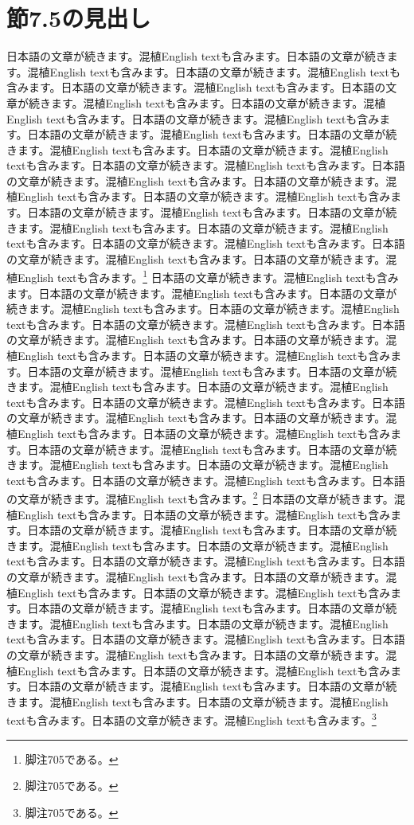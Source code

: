 \documentclass[pdflatex,book]{jlreq}
\begin{document}
\section{節7.5の見出し}
日本語の文章が続きます。混植English textも含みます。日本語の文章が続きます。混植English textも含みます。日本語の文章が続きます。混植English textも含みます。日本語の文章が続きます。混植English textも含みます。日本語の文章が続きます。混植English textも含みます。日本語の文章が続きます。混植English textも含みます。日本語の文章が続きます。混植English textも含みます。日本語の文章が続きます。混植English textも含みます。日本語の文章が続きます。混植English textも含みます。日本語の文章が続きます。混植English textも含みます。日本語の文章が続きます。混植English textも含みます。日本語の文章が続きます。混植English textも含みます。日本語の文章が続きます。混植English textも含みます。日本語の文章が続きます。混植English textも含みます。日本語の文章が続きます。混植English textも含みます。日本語の文章が続きます。混植English textも含みます。日本語の文章が続きます。混植English textも含みます。日本語の文章が続きます。混植English textも含みます。日本語の文章が続きます。混植English textも含みます。日本語の文章が続きます。混植English textも含みます。\footnote{脚注705である。}
日本語の文章が続きます。混植English textも含みます。日本語の文章が続きます。混植English textも含みます。日本語の文章が続きます。混植English textも含みます。日本語の文章が続きます。混植English textも含みます。日本語の文章が続きます。混植English textも含みます。日本語の文章が続きます。混植English textも含みます。日本語の文章が続きます。混植English textも含みます。日本語の文章が続きます。混植English textも含みます。日本語の文章が続きます。混植English textも含みます。日本語の文章が続きます。混植English textも含みます。日本語の文章が続きます。混植English textも含みます。日本語の文章が続きます。混植English textも含みます。日本語の文章が続きます。混植English textも含みます。日本語の文章が続きます。混植English textも含みます。日本語の文章が続きます。混植English textも含みます。日本語の文章が続きます。混植English textも含みます。日本語の文章が続きます。混植English textも含みます。日本語の文章が続きます。混植English textも含みます。日本語の文章が続きます。混植English textも含みます。日本語の文章が続きます。混植English textも含みます。\footnote{脚注705である。}
日本語の文章が続きます。混植English textも含みます。日本語の文章が続きます。混植English textも含みます。日本語の文章が続きます。混植English textも含みます。日本語の文章が続きます。混植English textも含みます。日本語の文章が続きます。混植English textも含みます。日本語の文章が続きます。混植English textも含みます。日本語の文章が続きます。混植English textも含みます。日本語の文章が続きます。混植English textも含みます。日本語の文章が続きます。混植English textも含みます。日本語の文章が続きます。混植English textも含みます。日本語の文章が続きます。混植English textも含みます。日本語の文章が続きます。混植English textも含みます。日本語の文章が続きます。混植English textも含みます。日本語の文章が続きます。混植English textも含みます。日本語の文章が続きます。混植English textも含みます。日本語の文章が続きます。混植English textも含みます。日本語の文章が続きます。混植English textも含みます。日本語の文章が続きます。混植English textも含みます。日本語の文章が続きます。混植English textも含みます。日本語の文章が続きます。混植English textも含みます。\footnote{脚注705である。}
\end{document}

